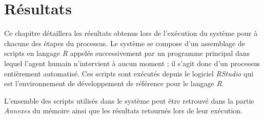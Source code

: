 \chapter{Résultats}
Ce chapitre détaillera les résultats obtenus lors de l'exécution du système pour à chacune des étapes du processus. Le système se compose d'un assemblage de scripts en langage \textit{R} appelés successivement par un programme principal dans lequel l'agent humain n'intervient à aucun moment ; il s'agit donc d'un processus entièrement automatisé. Ces scripts sont exécutés depuis le logiciel \textit{RStudio} qui est l'environnement de développement de référence pour le langage \textit{R}.

L'ensemble des scripts utilisés dans le système peut être retrouvé dans la partie \textit{Annexes} du mémoire ainsi que les résultats retournés lors de leur exécution.


